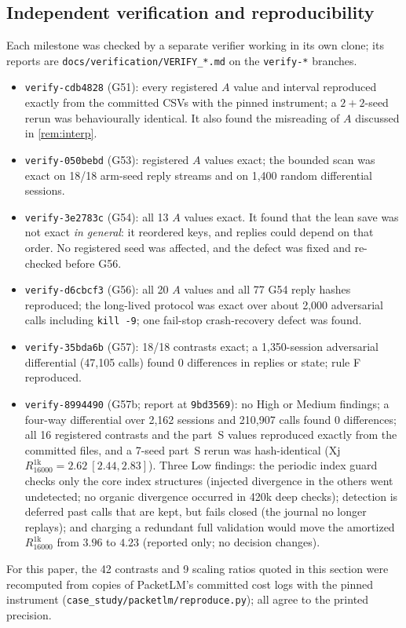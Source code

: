 \documentclass[11pt]{article}
\theoremstyle{remark}
\begin{document}
\subsection{Independent verification and reproducibility}\label{sec:repro}
Each milestone was checked by a separate verifier working in its own clone; its reports are \texttt{docs/verification/VERIFY\_*.md} on the \texttt{verify-*} branches.
\begin{itemize}[leftmargin=*,itemsep=1pt]
\item \texttt{verify-cdb4828} (G51): every registered $A$ value and interval reproduced exactly from the committed CSVs with the pinned instrument; a $2{+}2$-seed rerun was behaviourally identical. It also found the misreading of $A$ discussed in \cref{rem:interp}.
\item \texttt{verify-050bebd} (G53): registered $A$ values exact; the bounded scan was exact on 18/18 arm-seed reply streams and on 1{,}400 random differential sessions.
\item \texttt{verify-3e2783c} (G54): all 13 $A$ values exact. It found that the lean save was not exact \emph{in general}: it reordered keys, and replies could depend on that order. No registered seed was affected, and the defect was fixed and re-checked before G56.
\item \texttt{verify-d6cbcf3} (G56): all 20 $A$ values and all 77 G54 reply hashes reproduced; the long-lived protocol was exact over about 2{,}000 adversarial calls including \texttt{kill -9}; one fail-stop crash-recovery defect was found.
\item \texttt{verify-35bda6b} (G57): 18/18 contrasts exact; a 1{,}350-session adversarial differential (47{,}105 calls) found 0 differences in replies or state; rule F reproduced.
\item \texttt{verify-8994490} (G57b; report at \texttt{9bd3569}): no High or Medium findings; a four-way differential over 2{,}162 sessions and 210{,}907 calls found 0 differences; all 16 registered contrasts and the part~S values reproduced exactly from the committed files, and a 7-seed part~S rerun was hash-identical (Xj $R^{1\mathrm{k}}_{16000}=2.62\ [2.44,2.83]$). Three Low findings: the periodic index guard checks only the core index structures (injected divergence in the others went undetected; no organic divergence occurred in 420k deep checks); detection is deferred past calls that are kept, but fails closed (the journal no longer replays); and charging a redundant full validation would move the amortized $R^{1\mathrm{k}}_{16000}$ from $3.96$ to $4.23$ (reported only; no decision changes).
\end{itemize}
For this paper, the 42 contrasts and 9 scaling ratios quoted in this section were recomputed from copies of PacketLM's committed cost logs with the pinned instrument (\texttt{case\_study/\allowbreak packetlm/\allowbreak reproduce.py}); all agree to the printed precision.
\end{document}
